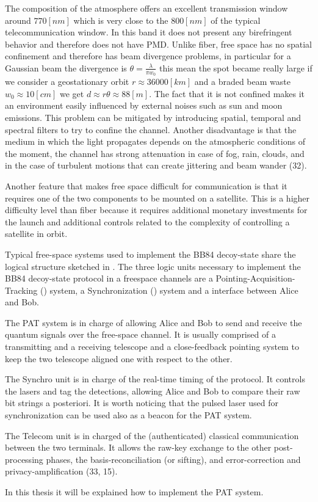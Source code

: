 The composition of the atmosphere offers an excellent transmission window around $770 [nm]$ which is very close to the $800 [nm]$ of the typical telecommunication window. In this band it does not present any birefringent behavior and therefore does not have PMD. Unlike fiber, free space has no spatial confinement and therefore has beam divergence problems, in particular for a Gaussian beam the divergence is $\theta = \frac{\lambda}{\pi w_0}$ this mean the spot became really large if we consider a geostationary orbit $r \approx 36000[km]$ and a braded beam waste $w_0 \approx 10 [cm]$ we get $d \approx r \theta \approx 88 [m]$. The fact that it is not confined makes it an environment easily influenced by external noises such as sun and moon emissions. This problem can be mitigated by introducing spatial, temporal and spectral filters to try to confine the channel. Another disadvantage is that the medium in which the light propagates depends on the atmospheric conditions of the moment, the channel has strong attenuation in case of fog, rain, clouds, and in the case of turbulent motions that can create jittering and beam wander (32).

Another feature that makes free space difficult for communication is that it requires one of the two components to be mounted on a satellite. This is a higher difficulty level than fiber because it requires additional monetary investments for the launch and additional controls related to the complexity of controlling a satellite in orbit.

Typical free-space systems used to implement the BB84 decoy-state share the logical structure sketched in . The three logic units necessary to implement the BB84 decoy-state protocol in a freespace channels are a Pointing-Acquisition-Tracking () system, a Synchronization () system and a  interface between Alice and Bob.

The PAT system is in charge of allowing Alice and Bob to send and receive the quantum signals over the free-space channel. It is usually comprised of a transmitting and a receiving telescope and a close-feedback pointing system to keep the two telescope aligned one with respect to the other.

The Synchro unit is in charge of the real-time timing of the protocol. It controls the lasers and tag the detections, allowing Alice and Bob to compare their raw bit strings a posteriori. It is worth noticing that the pulsed laser used for synchronization can be used also as a beacon for the PAT system.

The Telecom unit is in charged of the (authenticated) classical communication between the two terminals. It allows the raw-key exchange to the other post-processing phases, the basis-reconciliation (or sifting), and error-correction and privacy-amplification (33, 15).

In this thesis it will be explained how to implement the PAT system.
